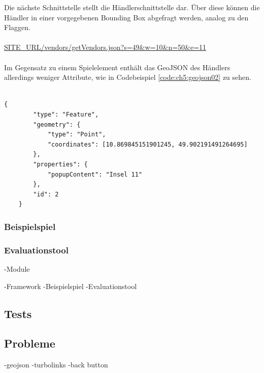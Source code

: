 Die nächste Schnittstelle stellt die Händlerschnittstelle dar. Über diese können die Händler in einer vorgegebenen Bounding Box abgefragt werden, analog zu den Flaggen.
\\\\
\url{SITE\_URL/vendors/getVendors.json?s=49&w=10&n=50&e=11}
\\\\
Im Gegensatz zu einem Spielelement enthält das GeoJSON des Händlers allerdings weniger Attribute, wie in Codebeispiel \ref{code:ch5:geojson02} zu sehen.
\\\\
\begin{lstlisting}[caption=GeoJSON Response Vendor (Reduziert), label=code:ch5:geojson02]
{
        "type": "Feature",
        "geometry": {
            "type": "Point",
            "coordinates": [10.869845151901245, 49.902191491264695]
        },
        "properties": {
            "popupContent": "Insel 11"
        },
        "id": 2
    }
\end{lstlisting}

\subsubsection*{Beispielspiel}
\subsubsection*{Evaluationstool}



-Module

-Framework
-Beispielspiel
-Evaluationstool



\subsection*{Tests}

\subsection*{Probleme}
-geojson
-turbolinks
-back button

